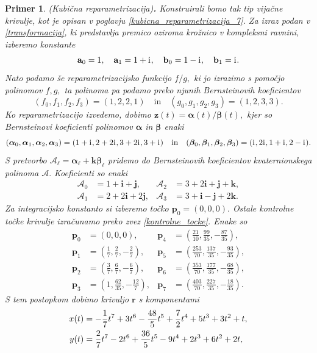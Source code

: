 \documentclass[12pt,a4paper,twoside]{article}
\newcommand{\iu}{\mathrm{i}\mkern1mu} %
\theoremstyle{definition} %
\theoremstyle{plain} %
\theoremstyle{primerstyle}
\newtheorem{primer}[definicija]{Primer}
\numberwithin{equation}{section}  %
\newcommand{\aV}{\mathbf{a}}
\newcommand{\bV}{\mathbf{b}}
\newcommand{\pV}{\mathbf{p}}
\newcommand{\rV}{\mathbf{r}}
\newcommand{\iV}{\mathbf{i}}
\newcommand{\jV}{\mathbf{j}}
\newcommand{\kV}{\mathbf{k}}
\newcommand{\zV}{\mathbf{z}}
\newcommand{\AQ}{\mathcal{A}}
\newcommand{\balpha}{\boldsymbol \alpha}
\newcommand{\bbeta}{\boldsymbol \beta}
\begin{document}
\begin{primer}
	\label{primer1}
	\textnormal{ }(Kubična reparametrizacija)\textbf{.}
	Konstruirali bomo tak tip vijačne krivulje, kot je opisan v poglavju \ref{kubicna_reparametrizacija_7}. Za izraz podan v \eqref{transformacija}, ki predstavlja premico oziroma krožnico v kompleksni ravnini, izberemo konstante
	\begin{equation*}
		\aV_0=1,\quad\aV_1=1+\iu,\quad\bV_0=1-\iu,\quad\bV_1=\iu.
	\end{equation*}
	Nato podamo še reparametrizacijsko funkcijo $f/g,$ ki jo izrazimo s pomočjo polinomov $f,g,$ ta polinoma pa podamo preko njunih Bernsteinovih koeficientov $$(f_0,f_1,f_2,f_3)=(1,2,2,1)\quad\text{in}\quad(g_0,g_1,g_2,g_3)=(1,2,3,3).$$ Ko reparametrizacijo izvedemo, dobimo $\zV(t)=\balpha(t)/\bbeta(t),$ kjer so Bernsteinovi koeficienti polinomov $\balpha$ in $\bbeta$ enaki $$(\balpha_0,\balpha_1,\balpha_2,\balpha_3)=(1+\iu,2+2\iu,3+2\iu,3+\iu)\quad\text{in}\quad(\bbeta_0,\bbeta_1,\bbeta_2,\bbeta_3)=(\iu,2\iu,1+\iu,2-\iu).$$ S pretvorbo $\AQ_\ell=\balpha_\ell+\kV\bbeta_\ell$ pridemo do Bernsteinovih koeficientov kvaternionskega polinoma $\AQ.$ Koeficienti so enaki
	\begin{align*}
		\AQ_0&=1+\iV+\jV,&\AQ_2&=3+2\iV+\jV+\kV,\\
		\AQ_1&=2+2\iV+2\jV,&\AQ_3&=3+\iV-\jV+2\kV.
	\end{align*}
	Za integracijsko konstanto si izberemo točko $\pV_0=(0,0,0).$ Ostale kontrolne točke krivulje izračunamo preko zvez \eqref{kontrolne_tocke}. Enake so
	\begin{align*}
		\pV_0&=(0,0,0),&\pV_4&=\left(\frac{21}{10},\frac{99}{35},-\frac{87}{35}\right),\\
		\pV_1&=\left(\frac{1}{7},\frac{2}{7},-\frac{2}{7}\right),&\pV_5&=\left(\frac{253}{70},\frac{137}{35},-\frac{93}{35}\right),\\
		\pV_2&=\left(\frac{3}{7},\frac{6}{7},-\frac{6}{7}\right),&\pV_6&=\left(\frac{353}{70},\frac{177}{35},-\frac{68}{35}\right),\\
		\pV_3&=\left(1,\frac{62}{35},-\frac{12}{7}\right),&\pV_7&=\left(\frac{403}{70},\frac{227}{35},-\frac{18}{35}\right).
	\end{align*}
	S tem postopkom dobimo krivuljo $\rV$ s komponentami
	\begin{align}
		x(t)&=-\frac{1}{7}t^7+3t^6-\frac{48}{5}t^5+\frac{7}{2}t^4+5t^3+3t^2+t,\notag\\
		y(t)&=\frac{2}{7}t^7-2t^6+\frac{36}{5}t^5-9t^4+2t^3+6t^2+2t,\label{primer1_krivulja}\\

\end{align}
\end{primer}
\end{document}
